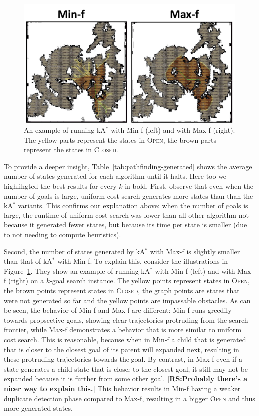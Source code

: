 \documentclass{aicom2e}
\newcommand{\kgs}{$k$-goal search}
\newcommand{\kastar}{kA$^*$}
\newcommand{\minf}{Min-f}
\newcommand{\maxf}{Max-f}
\newcommand{\open}{\textsc{Open}}
\newcommand{\closed}{\textsc{Closed}}
\newcommand{\roni}[1]{\textbf{[RS:#1]}}
\begin{document}
\begin{figure}
	\includegraphics[width=\columnwidth]{min-vs-max}      
	\caption{An example of running \kastar{} with \minf{} (left) and with \maxf{} (right). The yellow parts represent the states in \open{}, the brown parts represent the states in \closed{}.}
	\label{fig:min-vs-max}
\end{figure}

To provide a deeper insight, Table~\ref{tab:pathfinding-generated} shows the average number of states generated for each algorithm until it halts. Here too we highlihgted the best results for every $k$ in bold. 
First, observe that even when the number of goals is large, uniform cost search generates more states than than the \kastar{} variants. This confirms our explanation above: when the number of goals is large, the  runtime of uniform cost search was lower than all other algorithm not because it generated fewer states, but because its time per state is smaller (due to not needing to compute heuristics). 

Second, the number of states generated by \kastar{} with \maxf{} is slightly smaller than that of \kastar{} with \minf{}. To explain this, consider the illustrations in Figure~\ref{fig:min-vs-max}. They show an example of running \kastar{} with \minf{} (left) and with \maxf{} (right) on a \kgs{} instance. The yellow points represent states in \open{}, the brown points represent states in \closed{}, the graph points are states that were not generated so far and the yellow points are impassable obstacles. As can be seen, the behavior of \minf{} and \maxf{} are different: \minf{} runs greedily towards propsective goals, showing clear trajectories protruding from the search frontier, while \maxf{} demonstrates a behavior that is more similar to uniform cost search. This is reasonable, because when in \minf{} a child that is generated that is closer to the closest goal of its parent will expanded next, resulting in these protruding trajectories towards the goal. By contrast, in \maxf{} even if a state generates a child state that is closer to the closest goal, it still may not be expanded because it is further from some other goal. \roni{Probably there's a nicer way to explain this.} This behavior results in \minf{} having a weaker duplicate detection phase compared to \maxf{}, resulting in a bigger \open{} and thus more generated states. 
\end{document}
